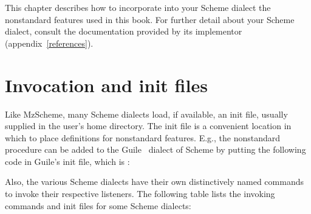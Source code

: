 This chapter describes how to incorporate into your
Scheme dialect the nonstandard features used in this
book.  For further detail about your Scheme
dialect, consult the documentation provided by its
implementor (appendix~\ref{references}).

\iffalse
\section{Invocation and init files}

\index{Guile}
\index{SCM}
\index{STk}

To invoke the Guile \cite{guile} listener, type \p{guile}.  To invoke
SCM \cite{scm}, type \p{scm}.

To invoke STk \cite{stk}, type \p{snow}.  This is the
“no window” executable, which is enough for the purposes
of this book.
\fi


\section{Invocation and init files}


Like MzScheme, many Scheme dialects load, if
available, an init file, usually supplied in the user’s
home directory.  The init file is a convenient location
in which to place definitions for nonstandard features.
E.g., the nonstandard procedure
 can be added to
the Guile~\cite{guile} dialect of Scheme by putting the
following code in Guile’s init file, which is
:


Also, the various Scheme dialects have their own
distinctively named commands to invoke their respective
listeners.  The following
table lists the invoking commands and init files
for some Scheme dialects:


